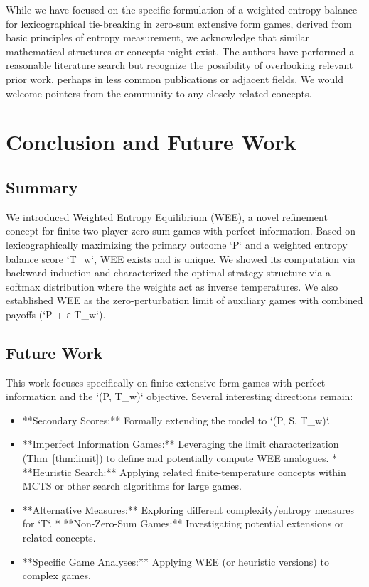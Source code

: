 \documentclass{article}
\begin{document}
While we have focused on the specific formulation of a weighted entropy balance for lexicographical tie-breaking in zero-sum extensive form games, derived from basic principles of entropy measurement, we acknowledge that similar mathematical structures or concepts might exist. The authors have performed a reasonable literature search but recognize the possibility of overlooking relevant prior work, perhaps in less common publications or adjacent fields. We would welcome pointers from the community to any closely related concepts.

\section{Conclusion and Future Work}

\subsection{Summary}
We introduced Weighted Entropy Equilibrium (WEE), a novel refinement concept for finite two-player zero-sum games with perfect information. Based on lexicographically maximizing the primary outcome `P` and a weighted entropy balance score `T_w`, WEE exists and is unique. We showed its computation via backward induction and characterized the optimal strategy structure via a softmax distribution where the weights act as inverse temperatures. We also established WEE as the zero-perturbation limit of auxiliary games with combined payoffs (`P + ε T_w`).

\subsection{Future Work}
This work focuses specifically on finite extensive form games with perfect information and the `(P, T_w)` objective. Several interesting directions remain:
\begin{itemize}
    \item **Secondary Scores:** Formally extending the model to `(P, S, T_w)`.
    \item **Imperfect Information Games:** Leveraging the limit characterization (Thm~\ref{thm:limit}) to define and potentially compute WEE analogues.
    * **Heuristic Search:** Applying related finite-temperature concepts within MCTS or other search algorithms for large games.
    \item **Alternative Measures:** Exploring different complexity/entropy measures for `T`.
    * **Non-Zero-Sum Games:** Investigating potential extensions or related concepts.
    \item **Specific Game Analyses:** Applying WEE (or heuristic versions) to complex games.
\end{itemize}
\end{document}

